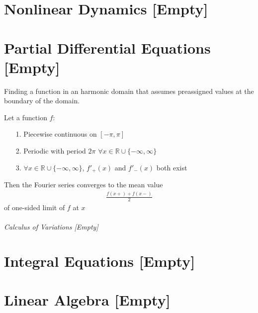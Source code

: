 \documentclass[12pt, english]{book}
\begin{document}
	\part{Nonlinear Dynamics [Empty]} \label{Nonlinear Dynamics Part}
	
	
	\part{Partial Differential Equations [Empty]} \label{Partial Differential Equations Part}
	
	\begin{definition}
		\label{Dirichlet Problem Definition - Partial}
		Finding a function in an harmonic domain that assumes preassigned values at the boundary of the domain.
	\end{definition}
	
	\begin{theorem}
		\label{Fourier Theorem - PDE}
		Let a function \(f\):
		\begin{itemize}
			\item[1.] Piecewise continuous on \([-\pi,\pi]\)
			\item[2.] Periodic with period \(2\pi\) \(\forall x \in \mathbb{R} \cup \{-\infty,\infty\}\)
			\item[3.] \(\forall x \in \mathbb{R} \cup \{-\infty,\infty\}\), \(f'_{+}(x)\) and \(f'_{-}(x)\) both exist 
		\end{itemize}
		Then the Fourier series converges to the mean value
		\begin{align*}
			\frac{f(x+) + f(x-)}{2}
		\end{align*}
		of one-sided limit of \(f\) at \(x\)
	\end{theorem}
	
	\paragraph{Calculus of Variations [Empty]} \label{Calculus of Variations Part}
	
	\part{Integral Equations [Empty]} \label{Integral Equations Part}
	
	
	\part{Linear Algebra [Empty]} \label{Linear Algebra Part}
	
\end{document}
